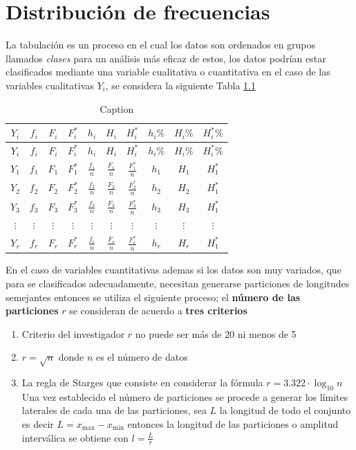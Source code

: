 \documentclass[10pt,]{krantz}
\theoremstyle{definition}
\theoremstyle{definition}
\theoremstyle{definition}
\theoremstyle{definition}
\theoremstyle{remark}
\begin{document}
\hypertarget{distribuciuxf3n-de-frecuencias}{%
\chapter{Distribución de frecuencias}\label{distribuciuxf3n-de-frecuencias}}

La tabulación es un proceso en el cual los datos son ordenados en grupos llamados \emph{clases} para un análisis más eficaz de estos, los datos podrían estar clasificados mediante una variable cualitativa o cuantitativa en el caso de las variables cualitativas \(Y_i\), se considera la siguiente Tabla \ref{tab:ww}

\begin{longtable}[]{@{}cccccccccc@{}}
\caption{\label{tab:ww} Caption}\tabularnewline
\toprule
\(Y_i\) & \(f_i\) & \(F_i\) & \(F_i^*\) & \(h_i\) & \(H_i\) & \(H_i^*\) & \(h_i\%\) & \(H_i\%\) & \(H_i^*\%\)\tabularnewline
\midrule
\endfirsthead
\toprule
\(Y_i\) & \(f_i\) & \(F_i\) & \(F_i^*\) & \(h_i\) & \(H_i\) & \(H_i^*\) & \(h_i\%\) & \(H_i\%\) & \(H_i^*\%\)\tabularnewline
\midrule
\endhead
\(Y_1\) & \(f_1\) & \(F_1\) & \(F_1^*\) & \(\frac{f_1}{n}\) & \(\frac{F_1}{n}\) & \(\frac{F_1^*}{n}\) & \(h_1\) & \(H_1\) & \(H_1^*\)\tabularnewline
\(Y_2\) & \(f_2\) & \(F_2\) & \(F_2^*\) & \(\frac{f_2}{n}\) & \(\frac{F_2}{n}\) & \(\frac{F_2^*}{n}\) & \(h_2\) & \(H_2\) & \(H_1^*\)\tabularnewline
\(Y_3\) & \(f_3\) & \(F_3\) & \(F_3^*\) & \(\frac{f_3}{n}\) & \(\frac{F_3}{n}\) & \(\frac{F_3^*}{n}\) & \(h_3\) & \(H_3\) & \(H_1^*\)\tabularnewline
\(\vdots\) & \(\vdots\) & \(\vdots\) & \(\vdots\) & \(\vdots\) & \(\vdots\) & \(\vdots\) & \(\vdots\) & \(\vdots\) & \(\vdots\)\tabularnewline
\(Y_r\) & \(f_r\) & \(F_r\) & \(F_r^*\) & \(\frac{f_r}{n}\) & \(\frac{F_r}{n}\) & \(\frac{F_r^*}{n}\) & \(h_r\) & \(H_r\) & \(H_1^*\)\tabularnewline
\bottomrule
\end{longtable}

En el caso de variables cuantitativas ademas si los datos son muy variados, que para se clasificados adecuadamente, necesitan generarse particiones de longitudes semejantes entonces se utiliza el siguiente proceso; el \textbf{número de las particiones} \(r\) se consideran de acuerdo a \textbf{tres criterios}

\begin{enumerate}
\def\labelenumi{\arabic{enumi}.}
\item
  Criterio del investigador \(r\) no puede ser más de 20 ni menos de 5
\item
  \(r=\sqrt{n}\) donde \(n\) es el número de datos
\item
  La regla de Starges que consiste en considerar la fórmula \(r=3.322\cdot\log_{10} n\)
  Una vez establecido el número de particiones se procede a generar los límites laterales de cada una de las particiones, sea \(L\) la longitud de todo el conjunto es decir \(L=x_{\text{max}}-x_{\text{min}}\) entonces la longitud de las particiones o amplitud interválica se obtiene con \(l=\frac{L}{r}\)
\end{enumerate}
\end{document}
